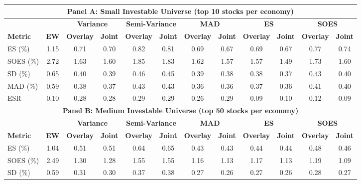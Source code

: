   \begin{tabular}{l*{11}{c}}
    \toprule
    \multicolumn{12}{c}{\textbf{Panel A: Small Investable Universe (top 10 stocks per economy)}} \\
    \midrule
    & & \multicolumn{2}{c}{\textbf{Variance}} & \multicolumn{2}{c}{\textbf{Semi-Variance}} & \multicolumn{2}{c}{\textbf{MAD}} & \multicolumn{2}{c}{\textbf{ES}} & \multicolumn{2}{c}{\textbf{SOES}} \\
    \cmidrule(lr){3-4} \cmidrule(lr){5-6} \cmidrule(lr){7-8} \cmidrule(lr){9-10} \cmidrule(lr){11-12}
    \textbf{Metric} & \textbf{EW} & \textbf{Overlay} & \textbf{Joint} & \textbf{Overlay} & \textbf{Joint} & \textbf{Overlay} & \textbf{Joint} & \textbf{Overlay} & \textbf{Joint} & \textbf{Overlay} & \textbf{Joint} \\
    \midrule
    ES (\%) & 1.15 & 0.71 & 0.70 & 0.82 & 0.81 & 0.69 & 0.67 & 0.69 & 0.67 & 0.77 & 0.74 \\
    SOES (\%) & 2.72 & 1.63 & 1.60 & 1.85 & 1.83 & 1.62 & 1.57 & 1.57 & 1.49 & 1.73 & 1.60 \\
    SD (\%) & 0.65 & 0.40 & 0.39 & 0.46 & 0.45 & 0.39 & 0.38 & 0.38 & 0.37 & 0.43 & 0.40 \\
    MAD (\%) & 0.59 & 0.38 & 0.37 & 0.43 & 0.43 & 0.36 & 0.36 & 0.37 & 0.36 & 0.41 & 0.40 \\
    ESR & 0.10 & 0.28 & 0.28 & 0.29 & 0.29 & 0.26 & 0.29 & 0.09 & 0.10 & 0.12 & 0.09 \\
    \midrule
    \multicolumn{12}{c}{\textbf{Panel B: Medium Investable Universe (top 50 stocks per economy)}} \\
    \midrule
    & & \multicolumn{2}{c}{\textbf{Variance}} & \multicolumn{2}{c}{\textbf{Semi-Variance}} & \multicolumn{2}{c}{\textbf{MAD}} & \multicolumn{2}{c}{\textbf{ES}} & \multicolumn{2}{c}{\textbf{SOES}} \\
    \cmidrule(lr){3-4} \cmidrule(lr){5-6} \cmidrule(lr){7-8} \cmidrule(lr){9-10} \cmidrule(lr){11-12}
    \textbf{Metric} & \textbf{EW} & \textbf{Overlay} & \textbf{Joint} & \textbf{Overlay} & \textbf{Joint} & \textbf{Overlay} & \textbf{Joint} & \textbf{Overlay} & \textbf{Joint} & \textbf{Overlay} & \textbf{Joint} \\
    \midrule
    ES (\%) & 1.04 & 0.51 & 0.51 & 0.64 & 0.65 & 0.43 & 0.43 & 0.44 & 0.44 & 0.48 & 0.46 \\
    SOES (\%) & 2.49 & 1.30 & 1.28 & 1.55 & 1.55 & 1.16 & 1.13 & 1.17 & 1.13 & 1.19 & 1.09 \\
    SD (\%) & 0.59 & 0.31 & 0.30 & 0.37 & 0.38 & 0.27 & 0.26 & 0.27 & 0.26 & 0.28 & 0.27 \\

\end{tabular}
